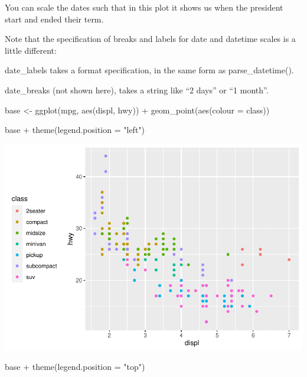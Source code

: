 \documentclass[
]{article}
\newenvironment{Shaded}{\begin{snugshade}}{\end{snugshade}}
\newcommand{\AttributeTok}[1]{\textcolor[rgb]{0.77,0.63,0.00}{#1}}
\newcommand{\FunctionTok}[1]{\textcolor[rgb]{0.00,0.00,0.00}{#1}}
\newcommand{\NormalTok}[1]{#1}
\newcommand{\OtherTok}[1]{\textcolor[rgb]{0.56,0.35,0.01}{#1}}
\newcommand{\SpecialCharTok}[1]{\textcolor[rgb]{0.00,0.00,0.00}{#1}}
\newcommand{\StringTok}[1]{\textcolor[rgb]{0.31,0.60,0.02}{#1}}
\begin{document}
You can scale the dates such that in this plot it shows us when the
president start and ended their term.

Note that the specification of breaks and labels for date and datetime
scales is a little different:

date\_labels takes a format specification, in the same form as
parse\_datetime().

date\_breaks (not shown here), takes a string like ``2 days'' or ``1
month''.

\begin{Shaded}
\begin{Highlighting}[]
\NormalTok{base }\OtherTok{\textless{}{-}} \FunctionTok{ggplot}\NormalTok{(mpg, }\FunctionTok{aes}\NormalTok{(displ, hwy)) }\SpecialCharTok{+}
  \FunctionTok{geom\_point}\NormalTok{(}\FunctionTok{aes}\NormalTok{(}\AttributeTok{colour =}\NormalTok{ class))}

\NormalTok{base }\SpecialCharTok{+} \FunctionTok{theme}\NormalTok{(}\AttributeTok{legend.position =} \StringTok{"left"}\NormalTok{)}
\end{Highlighting}
\end{Shaded}

\includegraphics{Journal_files/figure-latex/unnamed-chunk-62-1.pdf}

\begin{Shaded}
\begin{Highlighting}[]
\NormalTok{base }\SpecialCharTok{+} \FunctionTok{theme}\NormalTok{(}\AttributeTok{legend.position =} \StringTok{"top"}\NormalTok{)}
\end{Highlighting}
\end{Shaded}
\end{document}
